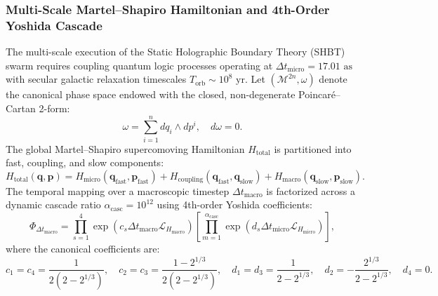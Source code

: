 \documentclass[11pt,onecolumn]{article}
\begin{document}
\subsubsection{Multi-Scale Martel--Shapiro Hamiltonian and 4th-Order Yoshida Cascade}
The multi-scale execution of the Static Holographic Boundary Theory (SHBT) swarm requires coupling quantum logic processes operating at $\Delta t_{\text{micro}} = 17.01\text{ as}$ with secular galactic relaxation timescales $T_{\text{orb}} \sim 10^8\text{ yr}$. Let $(\mathcal{M}^{2n}, \omega)$ denote the canonical phase space endowed with the closed, non-degenerate Poincar\'e--Cartan 2-form:
\begin{equation}
    \omega = \sum_{i=1}^n dq_i \wedge dp^i, \quad d\omega = 0.
    \label{eq:poincare_cartan_2form}
\end{equation}
The global Martel--Shapiro supercomoving Hamiltonian $H_{\text{total}}$ is partitioned into fast, coupling, and slow components:
\begin{equation}
    H_{\text{total}}(\mathbf{q}, \mathbf{p}) = H_{\text{micro}}(\mathbf{q}_{\text{fast}}, \mathbf{p}_{\text{fast}}) + H_{\text{coupling}}(\mathbf{q}_{\text{fast}}, \mathbf{q}_{\text{slow}}) + H_{\text{macro}}(\mathbf{q}_{\text{slow}}, \mathbf{p}_{\text{slow}}).
    \label{eq:hamiltonian_partition}
\end{equation}
The temporal mapping over a macroscopic timestep $\Delta t_{\text{macro}}$ is factorized across a dynamic cascade ratio $\alpha_{\text{casc}} = 10^{12}$ using 4th-order Yoshida coefficients:
\begin{equation}
    \Phi_{\Delta t_{\text{macro}}} = \prod_{s=1}^4 \exp\left( c_s \Delta t_{\text{macro}} \mathcal{L}_{H_{\text{macro}}} \right) \left[ \prod_{m=1}^{\alpha_{\text{casc}}} \exp\left( d_s \Delta t_{\text{micro}} \mathcal{L}_{H_{\text{micro}}} \right) \right],
    \label{eq:yoshida_cascade_operator}
\end{equation}
where the canonical coefficients are:
\begin{equation}
    c_1 = c_4 = \frac{1}{2(2 - 2^{1/3})}, \quad c_2 = c_3 = \frac{1 - 2^{1/3}}{2(2 - 2^{1/3})}, \quad d_1 = d_3 = \frac{1}{2 - 2^{1/3}}, \quad d_2 = -\frac{2^{1/3}}{2 - 2^{1/3}}, \quad d_4 = 0.
    \label{eq:yoshida_coefficients}
\end{equation}
\end{document}

